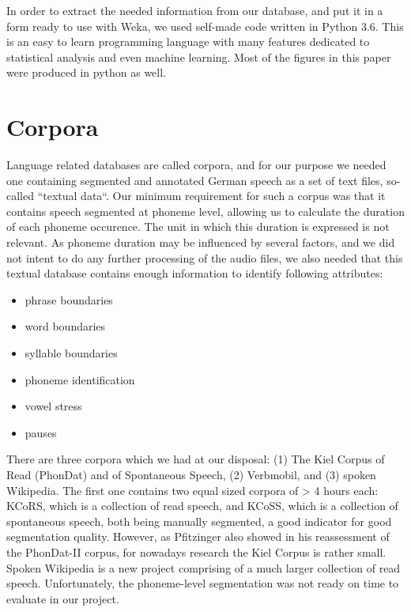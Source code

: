 \documentclass[11pt,a4paper]{scrbook}
\begin{document}
In order to extract the needed information from our database, and put it in a form ready to use with Weka, we used self-made code written in Python 3.6. This is an easy to learn programming language with many features dedicated to statistical analysis and even machine learning. Most of the figures in this paper were produced in python as well.

\chapter{Corpora}
Language related databases are called corpora, and for our purpose we needed one containing segmented and annotated German speech as a set of text files, so-called ``textual data``. Our minimum requirement for such a corpus was that it contains speech segmented at phoneme level, allowing us to calculate the duration of each phoneme occurence. The unit in which this duration is expressed is not relevant. As phoneme duration may be influenced by several factors, and we did not intent to do any further processing of the audio files, we also needed that this textual database contains enough information to identify following attributes: 

\begin{itemize}
	\item phrase boundaries
	\item word boundaries
	\item syllable boundaries
	\item phoneme identification
	\item vowel stress
	\item pauses
\end{itemize}

There are three corpora which we had at our disposal: (1) The Kiel Corpus of Read (PhonDat) and of Spontaneous Speech, (2) Verbmobil, and (3) spoken Wikipedia. The first one contains two equal sized corpora of > 4 hours each: KCoRS, which is a collection of read speech, and KCoSS, which is a collection of spontaneous speech, both being manually segmented, a good indicator for good segmentation quality. However, as Pfitzinger \cite{Pfitzinger2002} also showed in his reassessment of the PhonDat-II corpus, for nowadays research the Kiel Corpus is rather small. Spoken Wikipedia is a new project comprising of a much larger collection of read speech. Unfortunately, the phoneme-level segmentation was not ready on time to evaluate in our project.
\end{document}
